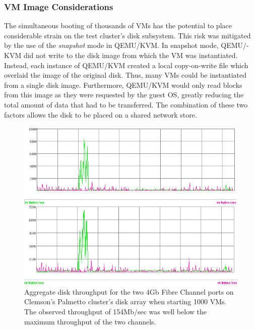 \subsubsection{\label{sub:VM-Image-Considerations}VM Image Considerations}

The simultaneous booting of thousands of VMs has the potential to
place considerable strain on the test cluster's disk subsystem. This
risk was mitigated by the use of the \emph{snapshot} mode in QEMU/KVM.
In snapshot mode, QEMU/-KVM did not write to the disk image from which
the VM was instantiated. Instead, each instance of QEMU/KVM created
a local copy-on-write file which overlaid the image of the original
disk. Thus, many VMs could be instantiated from a single disk image.
Furthermore, QEMU/KVM would only read blocks from this image as they
were requested by the guest OS, greatly reducing the total amount
of data that had to be transferred. The combination of these two factors
allows the disk to be placed on a shared network store.

%
\begin{figure}
\begin{centering}
\includegraphics[width=1\columnwidth]{figures/1000VMboot}
\par\end{centering}
\caption{\label{fig:Aggregate-Disk-Throughput}Aggregate disk throughput for the two
4Gb Fibre Channel ports on Clemson's Palmetto cluster's disk array when
starting 1000 VMs. The observed throughput of 154Mb/sec was well below the maximum
throughput of the two channels.}
\end{figure}

